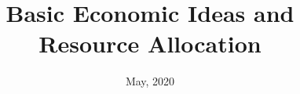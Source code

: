 \documentclass[handout,xcolor=x11names,compress]{beamer}
\renewcommand{\(}{\begin{columns}}
\renewcommand{\)}{\end{columns}}
\newcommand{\<}[1]{\begin{column}{#1}}
\renewcommand{\>}{\end{column}}
\begin{document}
\begin{frame}
\title{Basic Economic Ideas and Resource Allocation}
%
%
\date{
	\vspace{1cm}
	May, 2020 \\
}
\titlepage
\end{frame}  




\end{document}
